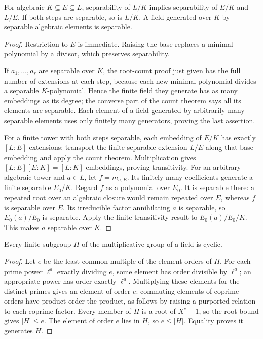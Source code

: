 \begin{theorem}
For algebraic $K\subseteq E\subseteq L$, separability of $L/K$ implies separability of $E/K$ and $L/E$. If both steps are separable, so is $L/K$. A field generated over $K$ by separable algebraic elements is separable.
\end{theorem}
\begin{proof}
Restriction to $E$ is immediate. Raising the base replaces a minimal polynomial by a divisor, which preserves separability.

If $a_1,\ldots,a_r$ are separable over $K$, the root-count proof just given has the full number of extensions at each step, because each new minimal polynomial divides a separable $K$-polynomial. Hence the finite field they generate has as many embeddings as its degree; the converse part of the count theorem says all its elements are separable. Each element of a field generated by arbitrarily many separable elements uses only finitely many generators, proving the last assertion.

For a finite tower with both steps separable, each embedding of $E/K$ has exactly $[L:E]$ extensions: transport the finite separable extension $L/E$ along that base embedding and apply the count theorem. Multiplication gives $[L:E][E:K]=[L:K]$ embeddings, proving transitivity. For an arbitrary algebraic tower and $a\in L$, let $f=m_{a,E}$. Its finitely many coefficients generate a finite separable $E_0/K$. Regard $f$ as a polynomial over $E_0$. It is separable there: a repeated root over an algebraic closure would remain repeated over $E$, whereas $f$ is separable over $E$. Its irreducible factor annihilating $a$ is separable, so $E_0(a)/E_0$ is separable. Apply the finite transitivity result to $E_0(a)/E_0/K$. This makes $a$ separable over $K$.
\end{proof}

\begin{lemma}\label{lem:finite-multiplicative-cyclic}
Every finite subgroup $H$ of the multiplicative group of a field is cyclic.
\end{lemma}
\begin{proof}
Let $e$ be the least common multiple of the element orders of $H$. For each prime power $\ell^a$ exactly dividing $e$, some element has order divisible by $\ell^a$; an appropriate power has order exactly $\ell^a$. Multiplying these elements for the distinct primes gives an element of order $e$: commuting elements of coprime orders have product order the product, as follows by raising a purported relation to each coprime factor. Every member of $H$ is a root of $X^e-1$, so the root bound gives $|H|\leq e$. The element of order $e$ lies in $H$, so $e\leq|H|$. Equality proves it generates $H$.
\end{proof}

